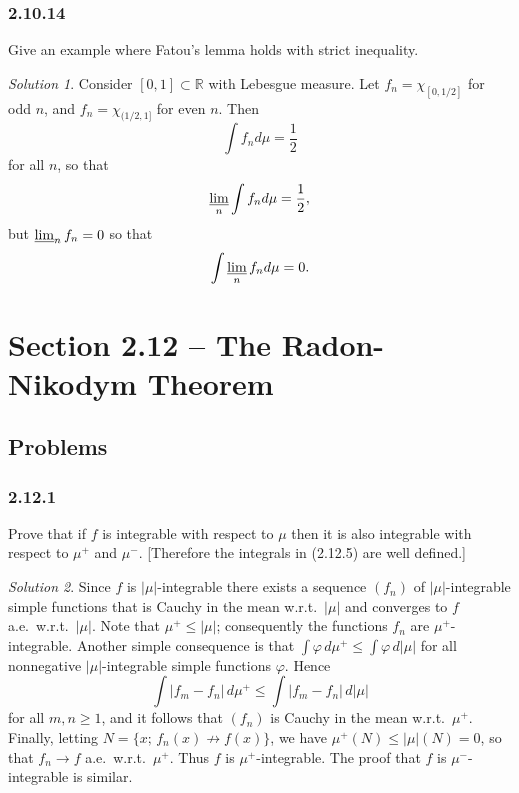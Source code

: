 \documentclass{report}
\newcommand{\bb}[1]{\mathbb{#1}}
\theoremstyle{remark}
\newtheorem*{solution}{Solution}
\begin{document}
\subsubsection*{2.10.14}
Give an example where Fatou's lemma holds with strict inequality.

\begin{solution}
  Consider $[0,1] \subset \bb R$ with Lebesgue measure. Let $f_n = \chi_{[0,1/2]}$ for odd $n$, and $f_n = \chi_{(1/2,1]}$ for even $n$. Then
  \begin{equation*}
    \int f_n d\mu = \frac{1}{2}
  \end{equation*}
  for all $n$, so that
  \begin{equation*}
    \varliminf_n \int f_n d\mu = \frac{1}{2},
  \end{equation*}
  but $\varliminf_n f_n = 0$ so that
  \begin{equation*}
    \int \varliminf_n f_n d\mu = 0.
  \end{equation*}
\end{solution}


\section*{Section 2.12 -- The Radon-Nikodym Theorem}

\subsection*{Problems}

\subsubsection*{2.12.1}
Prove that if $f$ is integrable with respect to $\mu$ then it is also integrable with respect to $\mu^+$ and $\mu^-$. [Therefore the integrals in (2.12.5) are well defined.]

\begin{solution}
  Since $f$ is $|\mu|$-integrable there exists a sequence $(f_n)$ of $|\mu|$-integrable simple functions that is Cauchy in the mean w.r.t.\ $|\mu|$ and converges to $f$ a.e.\ w.r.t.\ $|\mu|$. Note that $\mu^+ \le |\mu|$; consequently the functions $f_n$ are $\mu^+$-integrable. Another simple consequence is that $\int \varphi \, d\mu^+ \le \int \varphi \, d|\mu|$ for all nonnegative $|\mu|$-integrable simple functions $\varphi$. Hence
  \begin{equation*}
    \int |f_m - f_n| \, d\mu^+ \le \int |f_m - f_n| \, d|\mu|
  \end{equation*}
  for all $m,n \ge 1$, and it follows that $(f_n)$ is Cauchy in the mean w.r.t.\ $\mu^+$. Finally, letting $N = \{x; \, f_n(x) \not\to f(x)\}$, we have $\mu^+(N) \le |\mu|(N) = 0$, so that $f_n \to f$ a.e.\ w.r.t.\ $\mu^+$. Thus $f$ is $\mu^+$-integrable. The proof that $f$ is $\mu^-$-integrable is similar.
\end{solution}
\end{document}

